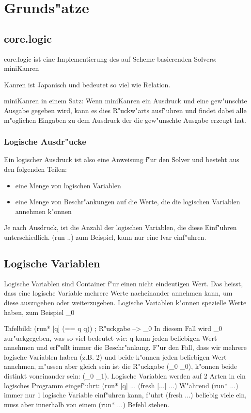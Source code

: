 \section{Grunds"atze}

\subsection{core.logic}

core.logic ist eine Implementierung des auf Scheme basierenden Solvers: miniKanren

Kanren ist Japanisch und bedeutet so viel wie Relation.

miniKanren in einem Satz: Wenn miniKanren ein Ausdruck und eine gew"unschte Ausgabe gegeben wird, kann es dies \dq{} R"uckw"arts \dq{} ausf"uhren und findet dabei alle m"oglichen Eingaben zu dem Ausdruck der die gew"unschte Ausgabe erzeugt hat.

\subsubsection{Logische Ausdr"ucke}

Ein logischer Ausdruck ist also eine Anweisung f"ur den Solver und besteht aus den folgenden Teilen:
\begin{itemize}

\item eine Menge von logischen Variablen

\item eine Menge von Beschr"ankungen auf die Werte, die die logischen Variablen annehmen k"onnen

\end{itemize}

Je nach Ausdruck, ist die Anzahl der logischen Variablen, die diese Einf"uhren unterschiedlich. (run ..) zum Beispiel, kann nur eine lvar einf"uhren.


\subsection{Logische Variablen}
Logische Variablen sind Container f"ur einen nicht eindeutigen Wert. Das heiss{}t, dass eine logische Variable mehrere Werte nacheinander annehmen kann, um diese auszugeben oder weiterzugeben.
Logische Variablen k"onnen spezielle Werte haben, zum Beispiel \_0
 
Tafelbild: (run* [q] (== q q)) ; R"uckgabe --> \_0
In diesem Fall wird \_0 zur"uckgegeben, was so viel bedeutet wie: q kann jeden beliebigen Wert annehmen und erf"ullt immer die Beschr"ankung.
F"ur den Fall, dass wir mehrere logische Variablen haben (z.B. 2) und beide k"onnen jeden beliebigen Wert annehmen, m"ussen aber gleich sein ist die R"uckgabe (\_0 \_0), k"onnen beide distinkt voneinander sein: (\_0 \_1).
Logische Variablen werden auf 2 Arten in ein logisches Programm eingef"uhrt:
(run* [q] ...
(fresh [...] ...)
W"ahrend (run* ...) immer nur 1 logische Variable einf"uhren kann, f"uhrt (fresh ...) beliebig viele ein, muss aber innerhalb von einem (run* ...) Befehl stehen.


